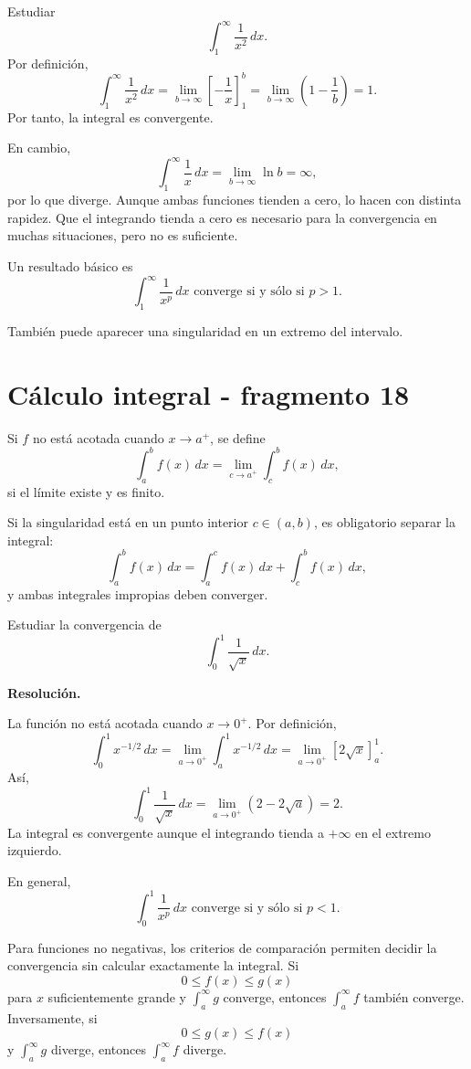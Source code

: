 \begin{example}
Estudiar
\[
\int_1^{\infty}\frac{1}{x^2}\,dx.
\]
Por definición,
\[
\int_1^{\infty}\frac{1}{x^2}\,dx
=
\lim_{b\to\infty}\left[-\frac1x\right]_1^b
=
\lim_{b\to\infty}\left(1-\frac1b\right)=1.
\]
Por tanto, la integral es convergente.
\end{example}

En cambio,
\[
\int_1^{\infty}\frac1x\,dx
=
\lim_{b\to\infty}\ln b
=\infty,
\]
por lo que diverge. Aunque ambas funciones tienden a cero, lo hacen con distinta rapidez. Que el integrando tienda a cero es necesario para la convergencia en muchas situaciones, pero no es suficiente.

Un resultado básico es
\[
\boxed{\int_1^{\infty}\frac{1}{x^p}\,dx
\text{ converge si y sólo si }p>1.}
\]

También puede aparecer una singularidad en un extremo del intervalo.


\section{Cálculo integral - fragmento 18}
\begin{definition}
Si $f$ no está acotada cuando $x\to a^+$, se define
\[
\int_a^b f(x)\,dx
=
\lim_{c\to a^+}\int_c^b f(x)\,dx,
\]
si el límite existe y es finito.
\end{definition}

Si la singularidad está en un punto interior $c\in(a,b)$, es obligatorio separar la integral:
\[
\int_a^b f(x)\,dx
=
\int_a^c f(x)\,dx+
\int_c^b f(x)\,dx,
\]
y ambas integrales impropias deben converger.

\begin{solvedexercise}
Estudiar la convergencia de
\[
\int_0^1\frac{1}{\sqrt{x}}\,dx.
\]

\textbf{Resolución.}\par\smallskip
La función no está acotada cuando $x\to0^+$. Por definición,
\[
\int_0^1x^{-1/2}\,dx
=
\lim_{a\to0^+}\int_a^1x^{-1/2}\,dx
=
\lim_{a\to0^+}\left[2\sqrt{x}\right]_a^1.
\]
Así,
\[
\int_0^1\frac{1}{\sqrt{x}}\,dx
=
\lim_{a\to0^+}(2-2\sqrt a)=2.
\]
La integral es convergente aunque el integrando tienda a $+\infty$ en el extremo izquierdo.
\end{solvedexercise}

En general,
\[
\boxed{\int_0^1\frac{1}{x^p}\,dx
\text{ converge si y sólo si }p<1.}
\]

Para funciones no negativas, los criterios de comparación permiten decidir la convergencia sin calcular exactamente la integral. Si
\[
0\leq f(x)\leq g(x)
\]
para $x$ suficientemente grande y $\int_a^\infty g$ converge, entonces $\int_a^\infty f$ también converge. Inversamente, si
\[
0\leq g(x)\leq f(x)
\]
y $\int_a^\infty g$ diverge, entonces $\int_a^\infty f$ diverge.

